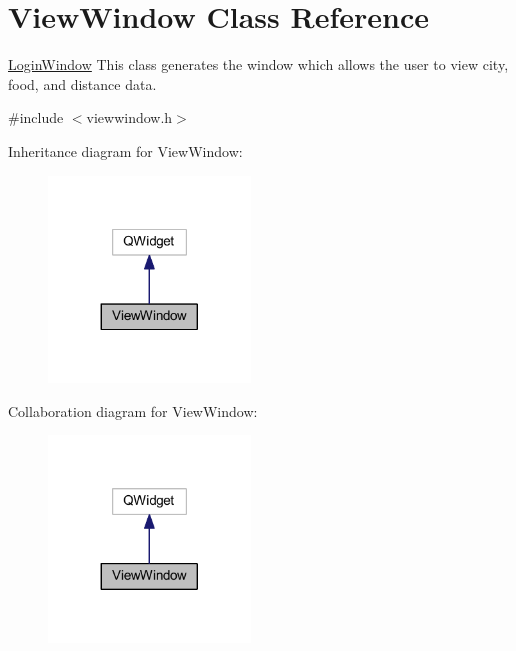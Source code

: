 \hypertarget{class_view_window}{}\section{View\+Window Class Reference}
\label{class_view_window}


\mbox{\hyperlink{class_login_window}{Login\+Window}} This class generates the window which allows the user to view city, food, and distance data.  




{\ttfamily \#include $<$viewwindow.\+h$>$}



Inheritance diagram for View\+Window\+:
\nopagebreak
\begin{figure}[H]
\begin{center}
\leavevmode
\includegraphics[width=152pt]{class_view_window__inherit__graph}
\end{center}
\end{figure}


Collaboration diagram for View\+Window\+:
\nopagebreak
\begin{figure}[H]
\begin{center}
\leavevmode
\includegraphics[width=152pt]{class_view_window__coll__graph}
\end{center}
\end{figure}
